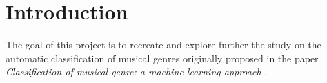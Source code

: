 \documentclass{Configuration_Files/PoliMi3i_thesis}
\begin{document}


\pagestyle{empty} %
\frontmatter %


\startpreamble
\setcounter{page}{1} %


\thispagestyle{empty}
\tableofcontents %
\thispagestyle{empty}
\cleardoublepage


\mainmatter %

\chapter*{Introduction}
\label{ch:introduction}%
The goal of this project is to recreate and explore further the study on the automatic classification of musical genres originally proposed in the paper \textit{Classification of musical genre: a machine learning approach} \cite{original-paper}.
\end{document}
